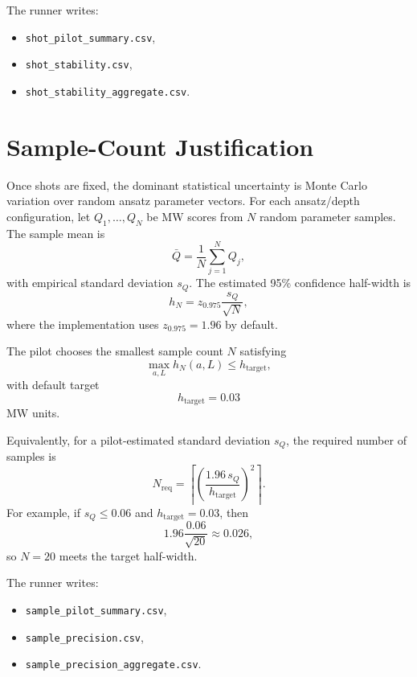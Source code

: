 \documentclass[11pt]{article}
\begin{document}
The runner writes:
\begin{itemize}
  \item \texttt{shot\_pilot\_summary.csv},
  \item \texttt{shot\_stability.csv},
  \item \texttt{shot\_stability\_aggregate.csv}.
\end{itemize}

\section{Sample-Count Justification}

Once shots are fixed, the dominant statistical uncertainty is Monte Carlo
variation over random ansatz parameter vectors. For each ansatz/depth
configuration, let \(Q_1,\dots,Q_N\) be MW scores from \(N\) random parameter
samples. The sample mean is
\begin{equation}
\bar Q
=
\frac{1}{N}
\sum_{j=1}^{N}Q_j,
\end{equation}
with empirical standard deviation \(s_Q\). The estimated 95\% confidence
half-width is
\begin{equation}
h_N
=
z_{0.975}
\frac{s_Q}{\sqrt{N}},
\label{eq:half_width}
\end{equation}
where the implementation uses \(z_{0.975}=1.96\) by default.

The pilot chooses the smallest sample count \(N\) satisfying
\begin{equation}
\max_{a,L} h_N(a,L)
\leq
h_{\mathrm{target}},
\label{eq:sample_rule}
\end{equation}
with default target
\begin{equation}
h_{\mathrm{target}}=0.03
\end{equation}
MW units.

Equivalently, for a pilot-estimated standard deviation \(s_Q\), the required
number of samples is
\begin{equation}
N_{\mathrm{req}}
=
\left\lceil
\left(
\frac{1.96\,s_Q}{h_{\mathrm{target}}}
\right)^2
\right\rceil.
\label{eq:n_req}
\end{equation}
For example, if \(s_Q\leq0.06\) and \(h_{\mathrm{target}}=0.03\), then
\begin{equation}
1.96\frac{0.06}{\sqrt{20}}
\approx
0.026,
\end{equation}
so \(N=20\) meets the target half-width.

The runner writes:
\begin{itemize}
  \item \texttt{sample\_pilot\_summary.csv},
  \item \texttt{sample\_precision.csv},
  \item \texttt{sample\_precision\_aggregate.csv}.
\end{itemize}
\end{document}
